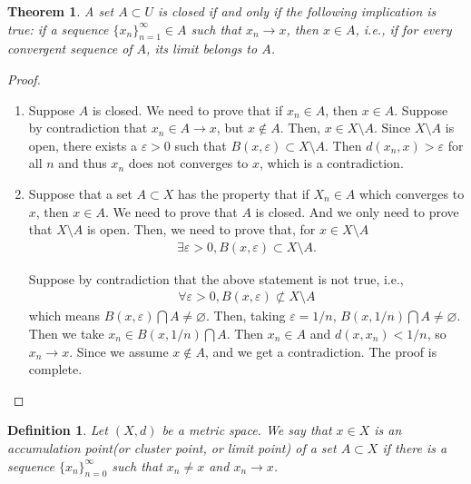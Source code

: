 \documentclass[12pt,leqno]{amsart}
\newtheorem{definition}{Definition}[section]
\newtheorem{theorem}{Theorem}[section]
\theoremstyle{definition}
\numberwithin{equation}{subsection}
\begin{document}
\medskip

\begin{theorem}
A set $A\subset U$ is closed if and only if the following implication is true: if a sequence $\{x_n\}_{n=1}^\infty\in A$ such that $x_n\rightarrow x$, then $x\in A$, i.e., if for every convergent sequence of $A$, its limit belongs to $A$.
\end{theorem}
\begin{proof}
~\begin{enumerate}
    \item Suppose $A$ is closed. We need to prove that if $x_n \in A$, then $x\in A$. Suppose by contradiction that $x_n\in A \rightarrow x$, but $x\notin A$. Then, $x\in X\setminus A$. Since $X\setminus A$ is open, there exists a $\varepsilon > 0$ such that $B(x,\varepsilon) \subset X\setminus A$. Then $d(x_n,x) > \varepsilon$ for all $n$ and thus $x_n$ does not converges to $x$, which is a contradiction.
    \item Suppose that a set $A\subset X$ has the property that if $X_n \in A$ which converges to $x$, then $x\in A$. We need to prove that $A$ is closed. And we only need to prove that $X\setminus A$ is open. Then, we need to prove that, for $x\in X\setminus A$
    \begin{align*}
        \exists \varepsilon > 0, B(x, \varepsilon)\subset X\setminus A.
    \end{align*}
    
    Suppose by contradiction that the above statement is not true, i.e., 
    \begin{align*}
        \forall \varepsilon > 0, B(x,\varepsilon)\not\subset X\setminus A
    \end{align*}
    which means $B(x,\varepsilon)\bigcap A \neq \varnothing$. Then, taking $\varepsilon = 1/n$, $B(x,1/n)\bigcap A \neq \varnothing$. Then we take $x_n\in B(x,1/n)\bigcap A$. Then $x_n\in A$ and $d(x,x_n) < 1/n$, so $x_n\rightarrow x$. Since we assume $x\notin A$, and we get a contradiction. The proof is complete.
\end{enumerate}
\end{proof}

\begin{definition}
Let $(X,d)$ be a metric space. We say that $x\in X$ is an accumulation point(or cluster point, or limit point) of a set $A\subset X$ if there is a sequence $\{x_n\}^\infty_{n=0}$ such that $x_n\neq x$ and $x_n \rightarrow x$.
\end{definition}
\end{document}
